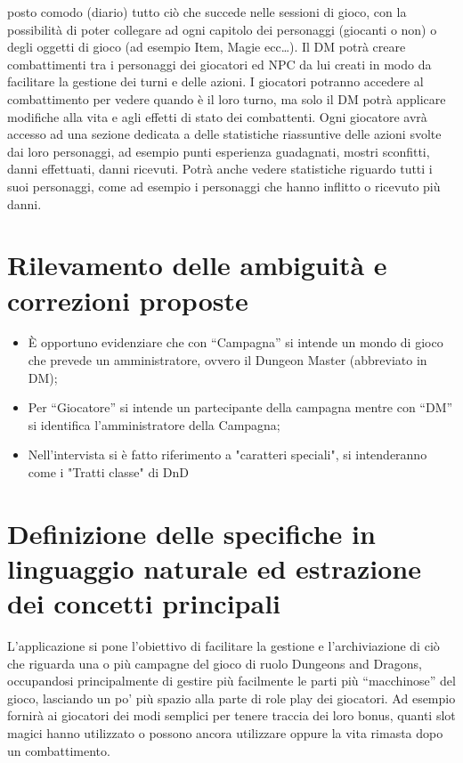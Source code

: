 \documentclass[a4paper,12pt]{report}
\begin{document}
posto comodo (diario) tutto ciò che succede nelle sessioni di gioco, con la possibilità di poter collegare ad ogni 
capitolo dei personaggi (giocanti o non) o degli oggetti di gioco (ad esempio Item, Magie ecc…).
%
Il DM potrà creare combattimenti tra i personaggi dei giocatori ed NPC da lui creati in modo da facilitare la gestione 
dei turni e delle azioni. I giocatori potranno accedere al combattimento per vedere quando è il loro turno, ma solo il DM 
potrà applicare modifiche alla vita e agli effetti di stato dei combattenti.
%
Ogni giocatore avrà accesso ad una sezione dedicata a delle statistiche riassuntive delle azioni svolte dai loro personaggi, 
ad esempio punti esperienza guadagnati, mostri sconfitti, danni effettuati, danni ricevuti. Potrà anche vedere statistiche 
riguardo tutti i suoi personaggi, come ad esempio i personaggi che hanno inflitto o ricevuto più danni.

\section{Rilevamento delle ambiguità e correzioni proposte}

\begin{itemize}
    \item È opportuno evidenziare che con \enquote{Campagna} si intende un mondo di gioco che prevede un amministratore, ovvero il Dungeon Master (abbreviato in DM);
    \item Per \enquote{Giocatore} si intende un partecipante della campagna mentre con \enquote{DM} si identifica l'amministratore della Campagna;
    \item Nell'intervista si è fatto riferimento a "caratteri speciali", si intenderanno come i "Tratti classe" di DnD
\end{itemize}

\section{Definizione delle specifiche in linguaggio naturale ed estrazione dei concetti principali}

L'applicazione si pone l'obiettivo di facilitare la gestione e l'archiviazione di ciò 
che riguarda una o più campagne del gioco di ruolo Dungeons and Dragons, occupandosi 
principalmente di gestire più facilmente le parti più \enquote{macchinose} del gioco, 
lasciando un po' più spazio alla parte di role play dei giocatori. 
%
Ad esempio fornirà ai giocatori dei modi semplici per tenere traccia dei loro bonus,
quanti slot magici hanno utilizzato o possono ancora utilizzare oppure la vita rimasta 
dopo un combattimento.
\end{document}
